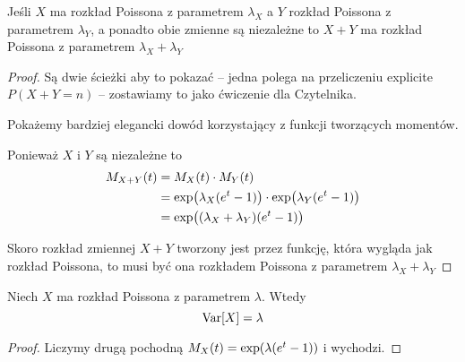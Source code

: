 \begin{theorem}[Lemat 5.2 P\&C]
    Jeśli \( X \) ma rozkład Poissona z parametrem \( \lambda_X \) a \( Y \) rozkład Poissona z parametrem \( \lambda_Y \), a ponadto obie zmienne są niezależne to \( X + Y \) ma rozkład Poissona z parametrem \( \lambda_X + \lambda_Y\)
\end{theorem}
\begin{proof}
    Są dwie ścieżki aby to pokazać -- jedna polega na przeliczeniu explicite \( P(X + Y = n) \) -- zostawiamy to jako ćwiczenie dla Czytelnika.
    
    Pokażemy bardziej elegancki dowód korzystający z funkcji tworzących momentów.
    
    Ponieważ \( X \) i \( Y \) są niezależne to
    \begin{align*}
        M_{X + Y}(t) 
            &= M_X(t) \cdot M_Y(t) \\
            &= \exp\pars{\lambda_X(e^t - 1)} \cdot \exp\pars{\lambda_Y(e^t - 1)} \\
            &= \exp\pars{(\lambda_X + \lambda_Y)(e^t - 1)}
    \end{align*}
    
    Skoro rozkład zmiennej \( X + Y \) tworzony jest przez funkcję, która wygląda jak rozkład Poissona, to musi być ona rozkładem Poissona z parametrem \( \lambda_X + \lambda_Y \)
\end{proof}
\begin{theorem}
    \label{poisson-variable-variance}
     Niech \( X \) ma rozkład Poissona z parametrem \( \lambda \). Wtedy
    \[
        \variance{X} = \lambda
    \]
\end{theorem}
\begin{proof}
    Liczymy drugą pochodną \( M_X(t) = \exp\pars{\lambda \pars{e^t - 1}} \) i wychodzi.
\end{proof}